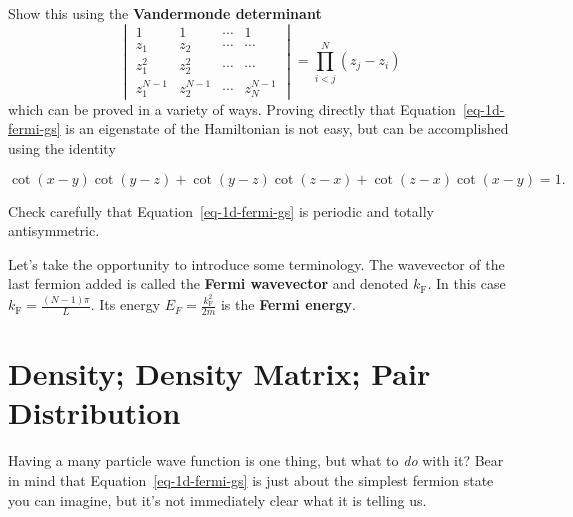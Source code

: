 \documentclass[
  letterpaper,
  DIV=11,
  numbers=noendperiod]{scrreprt}
\begin{document}
\begin{tcolorbox}[enhanced jigsaw, colback=white, bottomrule=.15mm, left=2mm, colbacktitle=quarto-callout-tip-color!10!white, breakable, colframe=quarto-callout-tip-color-frame, leftrule=.75mm, opacitybacktitle=0.6, opacityback=0, bottomtitle=1mm, toptitle=1mm, titlerule=0mm, title=\textcolor{quarto-callout-tip-color}{\faLightbulb}\hspace{0.5em}{Check}, toprule=.15mm, arc=.35mm, coltitle=black, rightrule=.15mm]

Show this using the \textbf{Vandermonde determinant} \[
\begin{vmatrix}
1 & 1 & \cdots & 1 \\
z_{1} &  z_{2} & \cdots & \cdots  \\
z_{1}^{2} & z_{2}^{2} & \cdots & \cdots  \\
z_{1}^{N-1} &  z_{2}^{N-1} & \cdots & z_{N}^{N-1}
\end{vmatrix}=\prod_{i<j}^{N}(z_{j}-z_{i})
\] which can be proved in a variety of ways. Proving directly that
Equation~\ref{eq-1d-fermi-gs} is an eigenstate of the Hamiltonian is not
easy, but can be accomplished using the identity

\[
\begin{equation}
\label{2nd_quant_cotident}
\cot(x-y)\cot(y-z)+\cot(y-z)\cot(z-x)+\cot(z-x)\cot(x-y)=1. \nonumber
\end{equation}
\]

Check carefully that Equation~\ref{eq-1d-fermi-gs} is periodic and
totally antisymmetric.

\end{tcolorbox}

Let's take the opportunity to introduce some terminology. The wavevector
of the last fermion added is called the \textbf{Fermi wavevector} and
denoted \(k_\text{F}\). In this case \(k_\text{F}=\frac{(N-1)\pi}{L}\).
Its energy \(E_{F}=\frac{k_\text{F}^{2}}{2m}\) is the \textbf{Fermi
energy}.

\section{Density; Density Matrix; Pair
Distribution}\label{density-density-matrix-pair-distribution}

Having a many particle wave function is one thing, but what to \emph{do}
with it? Bear in mind that Equation~\ref{eq-1d-fermi-gs} is just about
the simplest fermion state you can imagine, but it's not immediately
clear what it is telling us.
\end{document}
